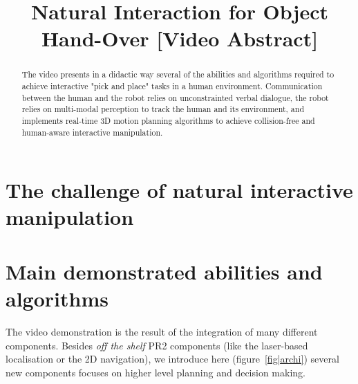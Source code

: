\documentclass[conference]{IEEEtran}
\begin{document}
%
\title{Natural Interaction for Object Hand-Over [Video Abstract]}


\author{
}
\maketitle


\begin{abstract}

The video presents in a didactic way several of the abilities and algorithms
required to achieve interactive "pick and place" tasks in a human environment.
Communication between the human and the robot relies on unconstrainted verbal
dialogue, the robot relies on multi-modal perception to track the human and its
environment, and implements real-time 3D motion planning algorithms to achieve
collision-free and human-aware interactive manipulation.

\end{abstract}


\section{The challenge of natural interactive manipulation}

\section{Main demonstrated abilities and algorithms}

The video demonstration is the result of the integration of many different
components. Besides {\it off the shelf} PR2 components (like the laser-based
localisation or the 2D navigation), we introduce here (figure~\ref{fig|archi})
several new components focuses on higher level planning and decision making.
\end{document}

